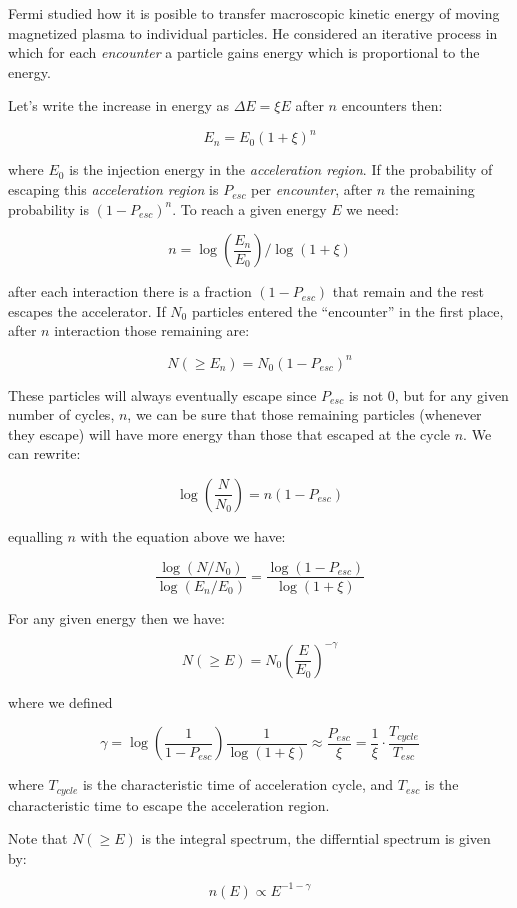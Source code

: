 \documentclass[
  letterpaper,
  DIV=11,
  numbers=noendperiod]{scrreprt}
\begin{document}
Fermi studied how it is posible to transfer macroscopic kinetic energy
of moving magnetized plasma to individual particles. He considered an
iterative process in which for each \emph{encounter} a particle gains
energy which is proportional to the energy.

Let's write the increase in energy as \(\Delta E = \xi E\) after \(n\)
encounters then:

\[E_n = E_0(1 + \xi)^n\]

where \(E_0\) is the injection energy in the \emph{acceleration region}.
If the probability of escaping this \emph{acceleration region} is
\(P_{esc}\) per \emph{encounter}, after \(n\) the remaining probability
is \((1 - P_{esc})^n\). To reach a given energy \(E\) we need:

\[n = \log\left(\frac{E_n}{E_0}\right)/\log(1 + \xi)\]

after each interaction there is a fraction \((1-P_{esc})\) that remain
and the rest escapes the accelerator. If \(N_0\) particles entered the
``encounter'' in the first place, after \(n\) interaction those
remaining are:

\[N(\ge  E_n) = N_0(1- P_{esc})^n\]

These particles will always eventually escape since \(P_{esc}\) is not
0, but for any given number of cycles, \(n\), we can be sure that those
remaining particles (whenever they escape) will have more energy than
those that escaped at the cycle \(n\). We can rewrite:

\[\log\left(\frac{N}{N_0}\right) = n(1 - P_{esc}) \]

equalling \(n\) with the equation above we have:

\[\frac{\log (N/N_0)}{\log (E_n/E_0)} = \frac{\log(1-P_{esc})}{\log(1+ \xi)}\]

For any given energy then we have:

\[N(\ge E) = N_0 \left(\frac{E}{E_0}\right)^{-\gamma}\]

where we defined

\[\gamma = \log\left(\frac{1}{1-P_{esc}}\right)\frac{1}{\log (1+\xi)} \approx \frac{P_{esc}}{\xi} = \frac{1}{\xi}\cdot\frac{T_{cycle}}{T_{esc}}\]

where \(T_{cycle}\) is the characteristic time of acceleration cycle,
and \(T_{esc}\) is the characteristic time to escape the acceleration
region.

Note that \(N(\ge E)\) is the integral spectrum, the differntial
spectrum is given by:

\[ n(E) \propto E^{-1 - \gamma} \]
\end{document}

